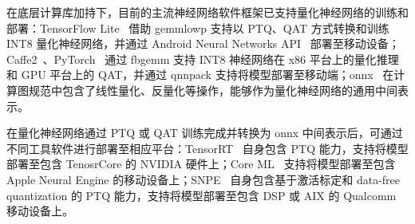 在底层计算库加持下，目前的主流神经网络软件框架已支持量化神经网络的训练和部署：TensorFlow Lite~\citep{abadi2016tensorflow} 借助 gemmlowp 支持以 PTQ、QAT 方式转换和训练 INT8 量化神经网络，并通过 Android Neural Networks API~\citep{google2020neurl} 部署至移动设备；Caffe2~\citep{markham2017caffe2}、PyTorch~\citep{paszke2019pytorch} 通过 fbgemm 支持 INT8 神经网络在 x86 平台上的量化推理和 GPU 平台上的 QAT，并通过 qnnpack 支持将模型部署至移动端；onnx~\citep{onnx2019onnx} 在计算图规范中包含了线性量化、反量化等操作，能够作为量化神经网络的通用中间表示。

在量化神经网络通过 PTQ 或 QAT 训练完成并转换为 onnx 中间表示后，可通过不同工具软件进行部署至相应平台：TensorRT~\citep{migacz20178} 自身包含 PTQ 能力，支持将模型部署至包含 TenosrCore 的 NVIDIA 硬件上；Core ML~\citep{apple2020coreml} 支持将模型部署至包含 Apple Neural Engine 的移动设备上；SNPE~\citep{qualcomm2019snpe} 自身包含基于激活标定和 data-free quantization 的 PTQ 能力，支持将模型部署至包含 DSP 或 AIX 的 Qualcomm 移动设备上。
